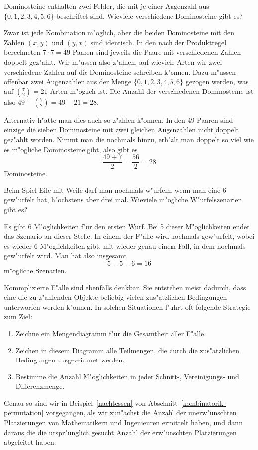 \begin{beispiele}
\item Dominosteine enthalten zwei Felder, die mit je einer Augenzahl
aus $\{0,1,2,3,4,5,6\}$ beschriftet sind. Wieviele verschiedene Dominosteine
gibt es?

\begin{loesung}
Zwar ist jede Kombination m"oglich, aber die beiden Dominosteine
mit den Zahlen $(x,y)$ und $(y,x)$ sind identisch. In den nach der
Produktregel berechneten $7\cdot 7=49$ Paaren sind jeweils die Paare
mit verschiedenen Zahlen doppelt gez"ahlt. Wir m"ussen also z"ahlen,
auf wieviele Arten wir zwei verschiedene Zahlen auf die Dominosteine
schreiben k"onnen. Dazu m"ussen offenbar zwei Augenzahlen aus
der Menge $\{0,1,2,3,4,5,6\}$ gezogen werden, was auf 
$\binom{7}{2}=21$ Arten m"oglich ist. Die Anzahl der verschiedenen
Dominosteine ist also $49 - \binom{7}{2}=49-21=28$.

Alternativ h"atte man dies auch so z"ahlen k"onnen. In den 49 Paaren sind
einzige die sieben Dominosteine mit zwei gleichen Augenzahlen nicht doppelt
gez"ahlt worden. Nimmt man die nochmals hinzu, erh"alt man doppelt so viel
wie es m"ogliche Dominosteine gibt, also gibt es
\[
\frac{49+7}{2}=\frac{56}2=28
\]
Dominosteine.
\end{loesung}

\item Beim Spiel Eile mit Weile darf man nochmals w"urfeln, wenn
man eine 6 gew"urfelt hat, h"ochstens aber drei mal. Wieviele
m"ogliche W"urfelszenarien gibt es?

\begin{loesung}
Es gibt 6 M"oglichkeiten f"ur den ersten Wurf.
Bei 5 dieser M"oglichkeiten endet das Szenario an dieser Stelle.
In einem der
F"alle wird nochmals gew"urfelt, wobei es wieder 6 M"oglichkeiten
gibt, mit wieder genau einem Fall, in dem nochmals gew"urfelt wird.
Man hat also insgesamt 
\[
5 + 5 + 6=16
\]
m"ogliche Szenarien.
\end{loesung}

\end{beispiele}

Kommplizierte F"alle sind ebenfalls denkbar. Sie entstehen meist dadurch, 
dass eine die zu z"ahlenden Objekte beliebig vielen zus"atzlichen
Bedingungen unterworfen werden k"onnen. In solchen Situationen
f"uhrt oft folgende Strategie zum Ziel:
\begin{enumerate}
\item Zeichne ein Mengendiagramm f"ur die Gesamtheit aller F"alle.
\item Zeichen in diesem Diagramm alle Teilmengen, die durch 
die zus"atzlichen Bedingungen ausgezeichnet werden.
\item Bestimme die Anzahl M"oglichkeiten in jeder Schnitt-, Vereinigungs-
und Differenzmenge.
\end{enumerate}
Genau so sind wir in Beispiel~\ref{nachtessen} von
Abschnitt~\ref{kombinatorik-permutation} vorgegangen,
als wir zun"achst die Anzahl der unerw"unschten Platzierungen
von Mathematikern und Ingenieuren ermittelt haben, und dann daraus
die die urspr"unglich gesucht Anzahl der erw"unschten Platzierungen
abgeleitet haben.

